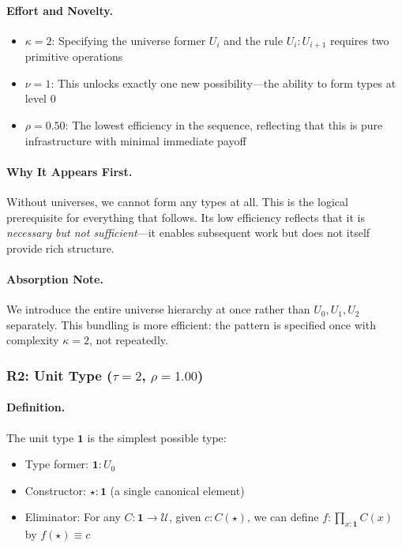 \documentclass[11pt]{article}
\theoremstyle{definition}
\begin{document}
\paragraph{Effort and Novelty.}
\begin{itemize}
\item $\kappa = 2$: Specifying the universe former $U_i$ and the rule $U_i : U_{i+1}$ requires two primitive operations
\item $\nu = 1$: This unlocks exactly one new possibility—the ability to form types at level 0
\item $\rho = 0.50$: The lowest efficiency in the sequence, reflecting that this is pure infrastructure with minimal immediate payoff
\end{itemize}

\paragraph{Why It Appears First.}
Without universes, we cannot form any types at all. This is the logical prerequisite for everything that follows. Its low efficiency reflects that it is \emph{necessary but not sufficient}—it enables subsequent work but does not itself provide rich structure.

\paragraph{Absorption Note.}
We introduce the entire universe hierarchy at once rather than $U_0, U_1, U_2$ separately. This bundling is more efficient: the pattern is specified once with complexity $\kappa=2$, not repeatedly.

\subsubsection{R2: Unit Type ($\tau=2$, $\rho=1.00$)}

\paragraph{Definition.}
The unit type $\mathbf{1}$ is the simplest possible type:
\begin{itemize}
\item Type former: $\mathbf{1} : U_0$
\item Constructor: $\star : \mathbf{1}$ (a single canonical element)
\item Eliminator: For any $C : \mathbf{1} \to \mathcal{U}$, given $c : C(\star)$, we can define $f : \prod_{x:\mathbf{1}} C(x)$ by $f(\star) \equiv c$
\end{itemize}
\end{document}
